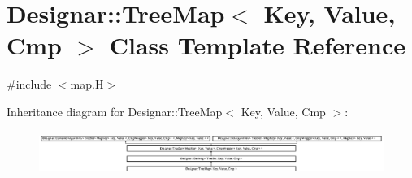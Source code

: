 \hypertarget{class_designar_1_1_tree_map}{}\section{Designar\+:\+:Tree\+Map$<$ Key, Value, Cmp $>$ Class Template Reference}
\label{class_designar_1_1_tree_map}


{\ttfamily \#include $<$map.\+H$>$}

Inheritance diagram for Designar\+:\+:Tree\+Map$<$ Key, Value, Cmp $>$\+:\begin{figure}[H]
\begin{center}
\leavevmode
\includegraphics[height=1.460235cm]{class_designar_1_1_tree_map}
\end{center}
\end{figure}
